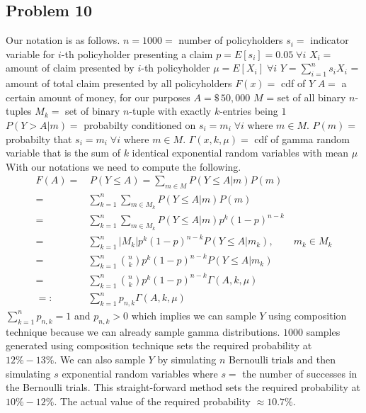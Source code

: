 \documentclass{article}
\begin{document}
\subsection*{Problem 10}
Our notation is as follows.
\newline
$n = 1000 = $ number of policyholders
\newline
$s_i = $ indicator variable for $i$-th policyholder presenting a claim
\newline
$p = E[s_i] = 0.05\;\forall i$
\newline
$X_i = $ amount of claim presented by $i$-th policyholder
\newline
$\mu = E[X_i]\;\forall i$
\newline
$Y = \sum_{i=1}^n s_i X_i$ = amount of total claim presented by all policyholders
\newline
$F(x) = $ cdf of $Y$
\newline
$A = $ a certain amount of money, for our purposes $A = \$\,50,000$
\newline
$M$ = set of all binary $n$-tuples
\newline
$M_k = $  set of binary $n$-tuple with exactly $k$-entries being $1$
\newline
$P(Y > A|m) = $ probabilty conditioned on $s_i=m_i\;\forall i$ where $m\in M$.
\newline
$P(m) = $ probabilty that $s_i = m_i\;\forall i$ where $m\in M$.
\newline
$\Gamma(x, k, \mu) = $ cdf of gamma random variable that is the sum of $k$ identical exponential random variables with mean $\mu$
\newline
With our notations we need to compute the following.
\begin{align*}
F(A) =& \,P(Y \le A) = \sum_{m\in M}P(Y \le A| m)P(m) \\
=& \sum_{k=1}^n\sum_{m\in M_k}P(Y \le A| m)P(m) \\
=& \sum_{k=1}^n\sum_{m\in M_k}P(Y \le A| m)p^k(1-p)^{n-k} \\
=& \sum_{k=1}^n |M_k|p^k(1-p)^{n-k} P(Y \le A| m_k) ,\qquad m_k\in M_k \\
=& \sum_{k=1}^n \binom{n}{k}p^k(1-p)^{n-k}P(Y \le A| m_k) \\
=& \sum_{k=1}^n \binom{n}{k}p^k(1-p)^{n-k}\Gamma(A, k, \mu) \\
=:& \sum_{k=1}^n p_{n,k}\Gamma(A, k, \mu)
\end{align*}
$\sum_{k=1}^n p_{n,k} = 1$ and $p_{n,k} > 0$ which implies we can sample $Y$ using composition technique because we can already sample gamma distributions. $1000$ samples generated using composition technique sets the required probability at $12\% - 13\%$. We can also sample $Y$ by simulating $n$ Bernoulli trials and then simulating $s$ exponential random variables where $s = $ the number of successes in the Bernoulli trials. This straight-forward method sets the required probability at $10\%-12\%$. The actual value of the required probability $\approx 10.7\%$.
\end{document}
